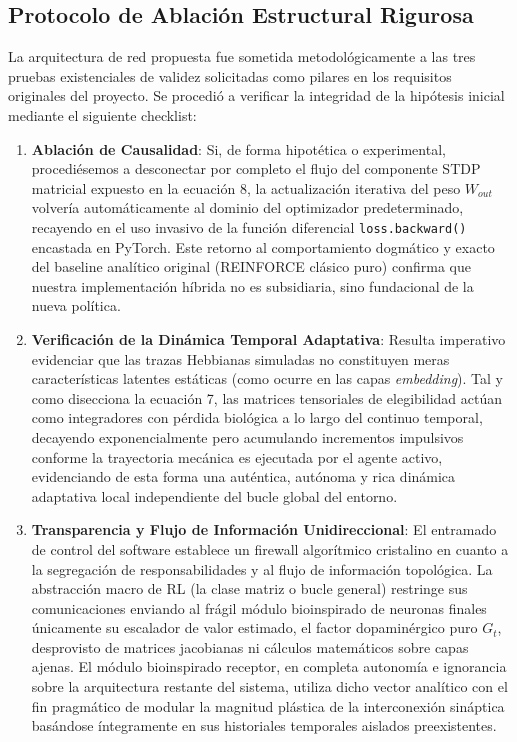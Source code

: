 \documentclass[a4paper,12pt,twocolumn]{article}
\begin{document}
\subsection{Protocolo de Ablación Estructural Rigurosa}
La arquitectura de red propuesta fue sometida metodológicamente a las tres pruebas existenciales de validez solicitadas como pilares en los requisitos originales del proyecto. Se procedió a verificar la integridad de la hipótesis inicial mediante el siguiente checklist:
\begin{enumerate}
    \item \textbf{Ablación de Causalidad}: Si, de forma hipotética o experimental, procediésemos a desconectar por completo el flujo del componente STDP matricial expuesto en la ecuación 8, la actualización iterativa del peso $W_{out}$ volvería automáticamente al dominio del optimizador predeterminado, recayendo en el uso invasivo de la función diferencial \texttt{loss.backward()} encastada en PyTorch. Este retorno al comportamiento dogmático y exacto del baseline analítico original (REINFORCE clásico puro) confirma que nuestra implementación híbrida no es subsidiaria, sino fundacional de la nueva política.
    \item \textbf{Verificación de la Dinámica Temporal Adaptativa}: Resulta imperativo evidenciar que las trazas Hebbianas simuladas no constituyen meras características latentes estáticas (como ocurre en las capas \textit{embedding}). Tal y como disecciona la ecuación 7, las matrices tensoriales de elegibilidad actúan como integradores con pérdida biológica a lo largo del continuo temporal, decayendo exponencialmente pero acumulando incrementos impulsivos conforme la trayectoria mecánica es ejecutada por el agente activo, evidenciando de esta forma una auténtica, autónoma y rica dinámica adaptativa local independiente del bucle global del entorno.
    \item \textbf{Transparencia y Flujo de Información Unidireccional}: El entramado de control del software establece un firewall algorítmico cristalino en cuanto a la segregación de responsabilidades y al flujo de información topológica. La abstracción macro de RL (la clase matriz o bucle general) restringe sus comunicaciones enviando al frágil módulo bioinspirado de neuronas finales únicamente su escalador de valor estimado, el factor dopaminérgico puro $G_t$, desprovisto de matrices jacobianas ni cálculos matemáticos sobre capas ajenas. El módulo bioinspirado receptor, en completa autonomía e ignorancia sobre la arquitectura restante del sistema, utiliza dicho vector analítico con el fin pragmático de modular la magnitud plástica de la interconexión sináptica basándose íntegramente en sus historiales temporales aislados preexistentes.
\end{enumerate}
\end{document}
